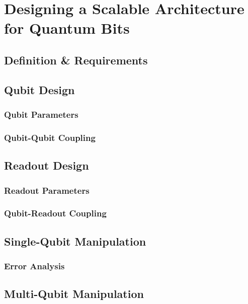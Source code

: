 \chapter{Designing a Scalable Architecture for Quantum Bits} \label{chapter:scalable_architecture}

\section{Definition \& Requirements}

\section{Qubit Design}

\subsection{Qubit Parameters}

\subsection{Qubit-Qubit Coupling}

\section{Readout Design}

\subsection{Readout Parameters}

\subsection{Qubit-Readout Coupling}

\section{Single-Qubit Manipulation}

\subsection{Error Analysis}

\section{Multi-Qubit Manipulation}

